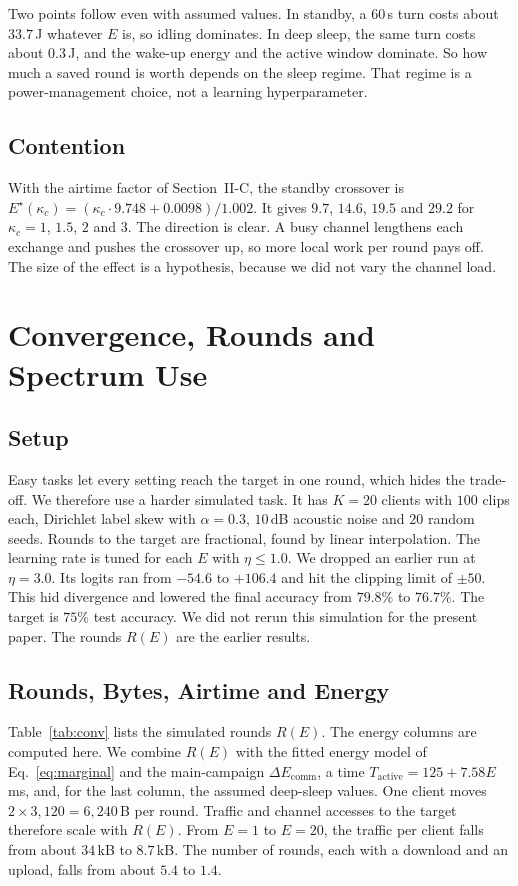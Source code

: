\documentclass[journal]{IEEEtran}
\newcommand{\Estar}{E^{\star}}
\begin{document}
Two points follow even with assumed values. In standby, a 60\,s turn costs about $33.7$\,J whatever $E$ is, so idling dominates. In deep sleep, the same turn costs about $0.3$\,J, and the wake-up energy and the active window dominate. So how much a saved round is worth depends on the sleep regime. That regime is a power-management choice, not a learning hyperparameter.

\subsection{Contention}
With the airtime factor of Section~II-C, the standby crossover is $\Estar(\kappa_c)=(\kappa_c\cdot9.748+0.0098)/1.002$. It gives $9.7$, $14.6$, $19.5$ and $29.2$ for $\kappa_c=1$, $1.5$, $2$ and $3$. The direction is clear. A busy channel lengthens each exchange and pushes the crossover up, so more local work per round pays off. The size of the effect is a hypothesis, because we did not vary the channel load.

\section{Convergence, Rounds and Spectrum Use}
\label{sec:conv}
\subsection{Setup}
Easy tasks let every setting reach the target in one round, which hides the trade-off. We therefore use a harder simulated task. It has $K=20$ clients with $100$ clips each, Dirichlet label skew with $\alpha=0.3$, $10$\,dB acoustic noise and $20$ random seeds. Rounds to the target are fractional, found by linear interpolation. The learning rate is tuned for each $E$ with $\eta\le1.0$. We dropped an earlier run at $\eta=3.0$. Its logits ran from $-54.6$ to $+106.4$ and hit the clipping limit of $\pm50$. This hid divergence and lowered the final accuracy from $79.8\%$ to $76.7\%$. The target is $75\%$ test accuracy. We did not rerun this simulation for the present paper. The rounds $R(E)$ are the earlier results.

\subsection{Rounds, Bytes, Airtime and Energy}
Table~\ref{tab:conv} lists the simulated rounds $R(E)$. The energy columns are computed here. We combine $R(E)$ with the fitted energy model of Eq.~\eqref{eq:marginal} and the main-campaign $\Delta E_{\mathrm{comm}}$, a time $T_{\mathrm{active}}=125+7.58E$\,ms, and, for the last column, the assumed deep-sleep values. One client moves $2\times3{,}120=6{,}240$\,B per round. Traffic and channel accesses to the target therefore scale with $R(E)$. From $E=1$ to $E=20$, the traffic per client falls from about $34$\,kB to $8.7$\,kB. The number of rounds, each with a download and an upload, falls from about $5.4$ to $1.4$.
\end{document}
